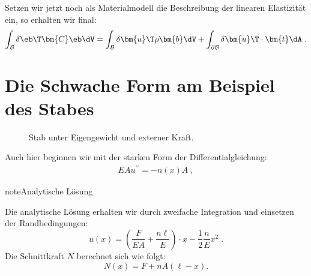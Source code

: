 \documentclass[letterpaper,10pt,german]{jupyterBook}
\let\sphinxpxdimen\pdfpxdimen\else\newdimen\sphinxpxdimen
\begin{document}
\sphinxAtStartPar
Setzen wir jetzt noch als Materialmodell die Beschreibung der linearen Elastizität ein, so erhalten wir final:
\begin{equation}\label{equation:chapters/chapter2/FEM:weakform_04}
\begin{split}\int_{\mathcal{B}} \delta\eb\T \bm{C} \eb \dV = \int_{\mathcal{B}} \delta \bm{u}\T \rho \bm{b} \dV + \int_{\partial\mathcal{B}} \delta \bm{u}\T \cdot \bm{t} \dA \; .\end{split}
\end{equation}
\sphinxstepscope




\section{Die Schwache Form am Beispiel des Stabes}
\label{\detokenize{chapters/chapter2/1dFEM:die-schwache-form-am-beispiel-des-stabes}}\label{\detokenize{chapters/chapter2/1dFEM::doc}}
\begin{figure}[htbp]
\centering
\capstart

\noindent\sphinxincludegraphics[height=400\sphinxpxdimen]{{Stab}.png}
\caption{Stab unter Eigengewicht und externer Kraft.}\label{\detokenize{chapters/chapter2/1dFEM:stab-fig}}\end{figure}

\sphinxAtStartPar
Auch hier beginnen wir mit der starken Form der Differentialgleichung:
\begin{equation}\label{equation:chapters/chapter2/1dFEM:stabdglsimple_2}
\begin{split} {EA} u^{\prime \prime} =  - {n(x)} A \; ,\end{split}
\end{equation}
\begin{sphinxadmonition}{note}{Analytische Lösung}

\sphinxAtStartPar
Die analytische Lösung erhalten wir durch zweifache Integration und einsetzen der Randbedingungen:
\label{equation:chapters/chapter2/1dFEM:00151201-f4db-4704-aade-97a5940eee76}\begin{equation}
u(x) = \left( \frac{F}{EA} + \frac{n \ell}{E}\right)\cdot x - \frac{1}{2} \frac{n}{E} x^2 \; . 
\end{equation}
\sphinxAtStartPar
Die Schnittkraft \(N\) berechnet sich wie folgt:
\label{equation:chapters/chapter2/1dFEM:b57581e6-42ec-49ae-a758-3a18ea1bdf52}\begin{equation}
N(x) = F + n A (\ell-x). 
\end{equation}\end{sphinxadmonition}
\end{document}
